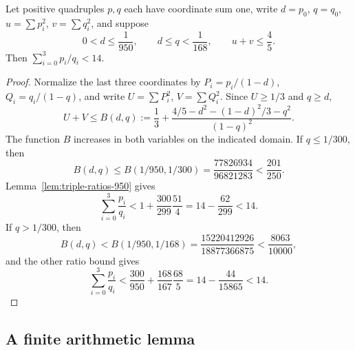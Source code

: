 \begin{lemma}\label{lem:relative-trace-950}
Let positive quadruples $p,q$ each have coordinate sum one, write
$d=p_0$, $q=q_0$, $u=\sum p_i^2$, $v=\sum q_i^2$, and suppose
\[
 0<d\le\frac1{950},\qquad d\le q<\frac1{168},\qquad
 u+v\le\frac45.
\]
Then $\sum_{i=0}^3p_i/q_i<14$.
\end{lemma}
\begin{proof}
Normalize the last three coordinates by
$P_i=p_i/(1-d)$, $Q_i=q_i/(1-q)$, and write
$U=\sum P_i^2$, $V=\sum Q_i^2$. Since $U\ge1/3$ and $q\ge d$,
\[
 U+V\le B(d,q):=\frac13+
 \frac{4/5-d^2-(1-d)^2/3-q^2}{(1-q)^2}.
\]
The function $B$ increases in both variables on the indicated domain.
If $q\le1/300$, then
\[
 B(d,q)\le B(1/950,1/300)
       =\frac{77826934}{96821283}<\frac{201}{250}.
\]
Lemma~\ref{lem:triple-ratios-950} gives
\[
 \sum_{i=0}^3\frac{p_i}{q_i}
 <1+\frac{300}{299}\frac{51}{4}
 =14-\frac{62}{299}<14.
\]
If $q>1/300$, then
\[
 B(d,q)<B(1/950,1/168)
       =\frac{15220412926}{18877366875}<\frac{8063}{10000},
\]
and the other ratio bound gives
\[
 \sum_{i=0}^3\frac{p_i}{q_i}
 <\frac{300}{950}+\frac{168}{167}\frac{68}{5}
 =14-\frac{44}{15865}<14.
\]
\end{proof}

\subsection{A finite arithmetic lemma}

